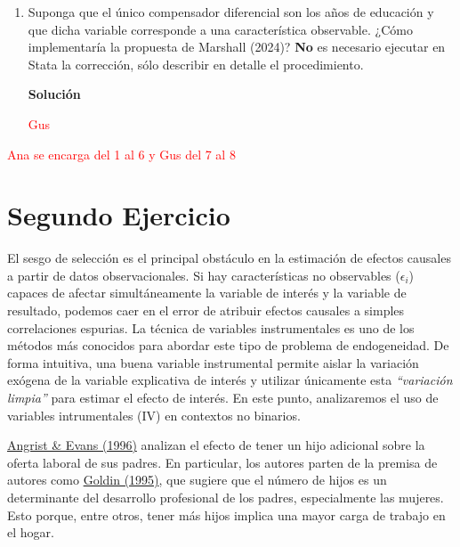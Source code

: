 \documentclass[a4paper, answers, addpoints, 11pt]{exam}
\newenvironment{solucion}{%
  \begin{mdframed}[
    backgroundcolor=blue!5,    %
    linecolor=blue!50,          %
    linewidth=2pt,              %
    leftmargin=10pt,            %
    rightmargin=8pt,           %
    topline=true,              %
    bottomline=true,            %
    roundcorner=10pt,           %
    innerleftmargin=10pt,       %
    innerrightmargin=10pt,      %
    innerbottommargin=10pt,     %
    innertopmargin=10pt         %
  ]%
  \begin{tcolorbox}[colframe=blue!50!black, colback=blue!50, coltitle=white, sharp corners=all, boxrule=1mm, width=\textwidth, halign=left, valign=center, top=0mm, bottom=0mm, left=0mm, right=0mm] \textbf{Solución} \end{tcolorbox} }{\end{mdframed}}
\begin{document}
\bigskip

\begin{enumerate}[resume]
\item Suponga que el único compensador diferencial son los años de educación y que dicha variable corresponde a una característica observable. ¿Cómo implementaría la propuesta de Marshall (2024)? \textbf{No} es necesario ejecutar en Stata la corrección, sólo describir en detalle el procedimiento.
    

\begin{solucion}
\textcolor{red}{Gus}
\end{solucion}
\end{enumerate}

\textcolor{red}{Ana se encarga del 1 al 6 y Gus del 7 al 8}

\newpage
\section*{Segundo Ejercicio}
El sesgo de selección es el principal obstáculo en la estimación de efectos causales a partir de datos observacionales. Si hay características no observables ($\epsilon_i$) capaces de afectar simultáneamente la variable de interés y la variable de resultado, podemos caer en el error de atribuir efectos causales a simples correlaciones espurias. La técnica de variables instrumentales es uno de los métodos más conocidos para abordar este tipo de problema de endogeneidad. De forma intuitiva, una buena variable instrumental permite aislar la variación exógena de la variable explicativa de interés y utilizar únicamente esta \textit{``variación limpia''} para estimar el efecto de interés. En este punto, analizaremos el uso de variables intrumentales (IV) en contextos no binarios.

\bigbreak
\href{https://www.nber.org/system/files/working_papers/w5778/w5778.pdf}{Angrist \& Evans (1996)} analizan el efecto de tener un hijo adicional sobre la oferta laboral de sus padres. En particular, los autores parten de la premisa de autores como \href{https://www.nber.org/system/files/working_papers/w5188/w5188.pdf}{Goldin (1995)}, que sugiere que el número de hijos es un determinante del desarrollo profesional de los padres, especialmente las mujeres. Esto porque, entre otros, tener más hijos implica una mayor carga de trabajo en el hogar. 
\end{document}
